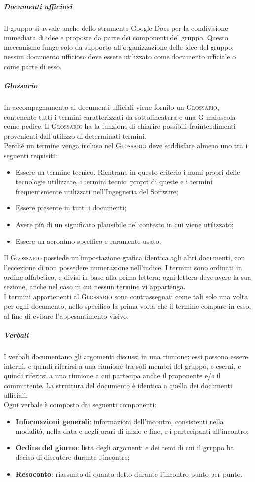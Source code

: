 \documentclass[../norme-di-progetto.tex]{subfiles}
\begin{document}
\subparagraph{Documenti ufficiosi}
Il gruppo si avvale anche dello strumento Google Docs per la condivisione immediata di idee e proposte da parte dei componenti del gruppo. Questo meccanismo funge solo da supporto all'organizzazione delle idee del gruppo; nessun documento ufficioso deve essere utilizzato come documento ufficiale o come parte di esso.

\subparagraph{Glossario}
In accompagnamento ai documenti ufficiali viene fornito un \textsc{Glossario}, contenente tutti i termini caratterizzati da sottolineatura e una G maiuscola come pedice. Il \textsc{Glossario} ha la funzione di chiarire possibili fraintendimenti provenienti dall'utilizzo di determinati termini. \\
Perché un termine venga incluso nel \textsc{Glossario} deve soddisfare almeno uno tra i seguenti requisiti:
\begin{itemize}
  \item Essere un termine tecnico. Rientrano in questo criterio i nomi propri delle tecnologie utilizzate, i termini tecnici propri di queste e i termini frequentemente utilizzati nell'Ingegneria del Software;
  \item Essere presente in tutti i documenti;
  \item Avere più di un significato plausibile nel contesto in cui viene utilizzato;
  \item Essere un acronimo specifico e raramente usato.
\end{itemize}
Il \textsc{Glossario} possiede un'impostazione grafica identica agli altri documenti, con l'eccezione di non possedere numerazione nell'indice. I termini sono ordinati in ordine alfabetico, e divisi in base alla prima lettera; ogni lettera deve avere la sua sezione, anche nel caso in cui nessun termine vi appartenga. \\
I termini appartenenti al \textsc{Glossario} sono contrassegnati come tali solo una volta per ogni documento, nello specifico la prima volta che il termine compare in esso, al fine di evitare l'appesantimento visivo.

\subparagraph{Verbali}
I verbali documentano gli argomenti discussi in una riunione; essi possono essere interni, e quindi riferirsi a una riunione tra soli membri del gruppo, o eserni, e quindi riferirsi a una riunione a cui partecipa anche il proponente e/o il committente. La struttura del documento è identica a quella dei documenti ufficiali. \\
Ogni verbale è composto dai seguenti componenti:
\begin{itemize}
  \item \textbf{Informazioni generali}: informazioni dell'incontro, consistenti nella modalità, nella data e negli orari di inizio e fine, e i partecipanti all'incontro;
  \item \textbf{Ordine del giorno}: lista degli argomenti e dei temi di cui il gruppo ha deciso di discutere durante l'incontro;
  \item \textbf{Resoconto}: riassunto di quanto detto durante l'incontro punto per punto.
\end{itemize}
\end{document}
